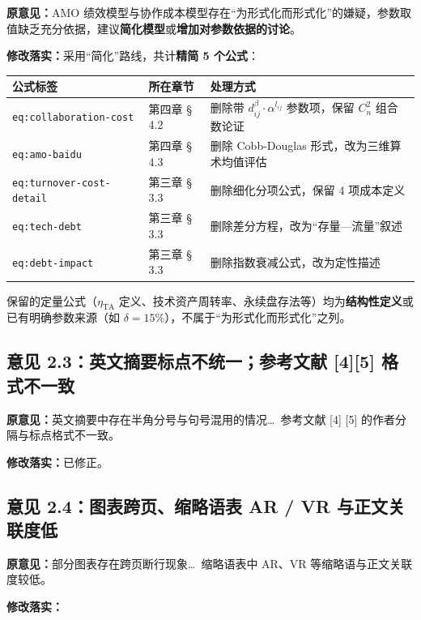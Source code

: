 \documentclass[11pt,a4paper]{ctexart}
\begin{document}
\noindent\textbf{原意见：}AMO 绩效模型与协作成本模型存在“为形式化而形式化”的嫌疑，参数取值缺乏充分依据，建议\textbf{简化模型}或\textbf{增加对参数依据的讨论}。

\noindent\textbf{修改落实：}采用“简化”路线，共计\textbf{精简 5 个公式}：

\begin{center}
\fontsize{9}{11}\selectfont
\begin{tabular}{lll}
\toprule
\textbf{公式标签} & \textbf{所在章节} & \textbf{处理方式} \\
\midrule
\texttt{eq:collaboration-cost} & 第四章 § 4.2 & 删除带 $d_{ij}^\beta \cdot \alpha^{l_{ij}}$ 参数项，保留 $C_n^2$ 组合数论证 \\
\texttt{eq:amo-baidu}          & 第四章 § 4.3 & 删除 Cobb-Douglas 形式，改为三维算术均值评估 \\
\texttt{eq:turnover-cost-detail} & 第三章 § 3.3 & 删除细化分项公式，保留 4 项成本定义 \\
\texttt{eq:tech-debt}          & 第三章 § 3.3 & 删除差分方程，改为“存量—流量”叙述 \\
\texttt{eq:debt-impact}        & 第三章 § 3.3 & 删除指数衰减公式，改为定性描述 \\
\bottomrule
\end{tabular}
\end{center}

保留的定量公式（$\eta_{\mathrm{TA}}$ 定义、技术资产周转率、永续盘存法等）均为\textbf{结构性定义}或已有明确参数来源（如 $\delta=15\%$），不属于“为形式化而形式化”之列。

\subsection{意见 2.3：英文摘要标点不统一；参考文献 [4][5] 格式不一致}

\noindent\textbf{原意见：}英文摘要中存在半角分号与句号混用的情况\ldots\ 参考文献 [4] [5] 的作者分隔与标点格式不一致。

\noindent\textbf{修改落实：}已修正。

\subsection{意见 2.4：图表跨页、缩略语表 AR / VR 与正文关联度低}

\noindent\textbf{原意见：}部分图表存在跨页断行现象\ldots\ 缩略语表中 AR、VR 等缩略语与正文关联度较低。

\noindent\textbf{修改落实：}
\end{document}
